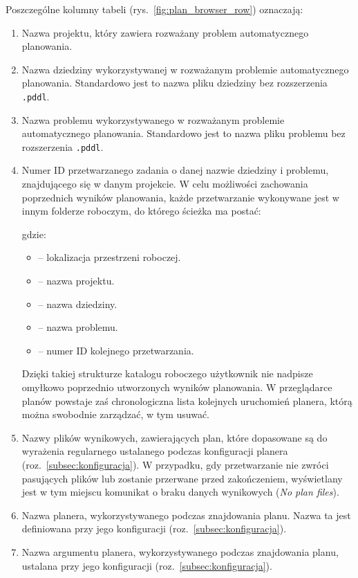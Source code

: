 \noindent
Poszczególne kolumny tabeli (rys.~\ref{fig:plan_browser_row}) oznaczają:
\begin{enumerate}[label=\protect\circled{\arabic*}]
\item Nazwa projektu, który zawiera rozważany problem automatycznego planowania.
\item Nazwa dziedziny wykorzystywanej w rozważanym problemie automatycznego planowania. Standardowo jest to nazwa pliku dziedziny bez rozszerzenia \texttt{.pddl}.
\item Nazwa problemu wykorzystywanego w rozważanym problemie automatycznego planowania. Standardowo jest to nazwa pliku problemu bez rozszerzenia \texttt{.pddl}.
\item Numer ID przetwarzanego zadania o danej nazwie dziedziny i problemu, znajdującego się w danym projekcie. W celu możliwości zachowania poprzednich wyników planowania, każde przetwarzanie wykonywane jest w innym folderze roboczym, do którego ścieżka ma postać:

\noindent
\centerline{}

\noindent
gdzie:

\begin{itemize}
\item \textbf{} -- lokalizacja przestrzeni roboczej.
\item \textbf{} -- nazwa projektu.
\item \textbf{} -- nazwa dziedziny.
\item \textbf{} -- nazwa problemu.
\item \textbf{} -- numer ID kolejnego przetwarzania.
\end{itemize}
Dzięki takiej strukturze katalogu roboczego użytkownik nie nadpisze omyłkowo poprzednio utworzonych wyników planowania. W przeglądarce planów powstaje zaś chronologiczna lista kolejnych uruchomień planera, którą można swobodnie zarządzać, w tym usuwać.
\item Nazwy plików wynikowych, zawierających plan, które dopasowane są do wyrażenia regularnego ustalanego podczas konfiguracji planera (roz.~\ref{subsec:konfiguracja}). W przypadku, gdy przetwarzanie nie zwróci pasujących plików lub zostanie przerwane przed zakończeniem, wyświetlany jest w tym miejscu komunikat o braku danych wynikowych (\textit{No plan files}).
\item Nazwa planera, wykorzystywanego podczas znajdowania planu. Nazwa ta jest definiowana przy jego konfiguracji (roz.~\ref{subsec:konfiguracja}).
\item Nazwa argumentu planera, wykorzystywanego podczas znajdowania planu, ustalana przy jego konfiguracji (roz.~\ref{subsec:konfiguracja}).
\end{enumerate}

